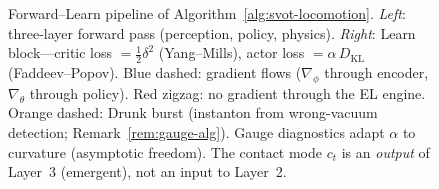 \documentclass[11pt,a4paper]{article}
\begin{document}
\begin{figure}[ht]

\caption{Forward--Learn pipeline of
  Algorithm~\ref{alg:svot-locomotion}.
  \emph{Left}: three-layer forward pass
  (perception, policy, physics).
  \emph{Right}: Learn block---critic loss
  $= \tfrac12\delta^2$ (Yang--Mills),
  actor loss $= \alpha\,D_{\mathrm{KL}}$
  (Faddeev--Popov).
  Blue dashed: gradient flows
  ($\nabla_\phi$ through encoder,
   $\nabla_\theta$ through policy).
  Red zigzag: no gradient through the EL engine.
  Orange dashed: Drunk burst (instanton from
  wrong-vacuum detection;
  Remark~\ref{rem:gauge-alg}).
  Gauge diagnostics adapt $\alpha$ to curvature
  (asymptotic freedom).
  The contact mode $c_t$ is an \emph{output}
  of Layer~3 (emergent), not an input
  to Layer~2.}
\label{fig:locomotion-pipeline}
\end{figure}

\end{document}
